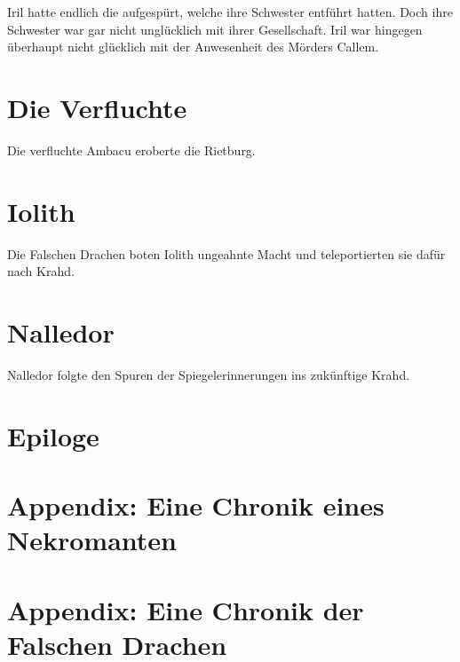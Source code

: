 Iril hatte endlich die  aufgespürt, welche ihre Schwester entführt hatten. Doch ihre Schwester war gar nicht unglücklich mit ihrer Gesellschaft. Iril war hingegen überhaupt nicht glücklich mit der Anwesenheit des Mörders Callem.








\newpage
\section{Die Verfluchte}


Die verfluchte Ambacu eroberte die Rietburg.








\newpage
\section{Iolith}


Die Falschen Drachen boten Iolith ungeahnte Macht und teleportierten sie dafür nach Krahd.








\newpage
\section{Nalledor}

Nalledor folgte den Spuren der Spiegelerinnerungen ins zukünftige Krahd.









\newpage
\section{Epiloge}















\newpage
\section{Appendix: Eine Chronik eines Nekromanten}






\newpage
\section{Appendix: Eine Chronik der Falschen Drachen}


